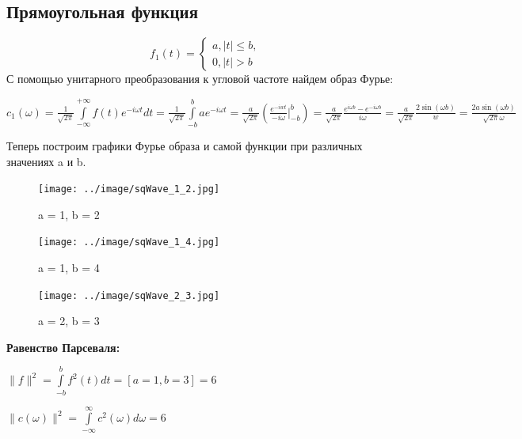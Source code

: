   \subsection{Прямоугольная функция}
  \[
  f_1(t) =  \begin{cases}
    a, |t| \leq b,\\
    0, |t| > b
  \end{cases}
  \]
  \noindent С помощью унитарного преобразования к угловой частоте найдем образ Фурье:
  \\
  \begin{center}
  $c_1(\omega) = \frac{1}{\sqrt{2\pi}} \int\limits_{-\infty}^{+\infty}f(t)e^{-i\omega t}dt = \frac{1}{\sqrt{2\pi}}\int\limits_{-b}^b a e^{-i\omega t} = 
  \frac{a}{\sqrt{2 \pi}} (\frac{e^{-iwt}}{-i\omega}|_{-b}^b) = \frac{a}{\sqrt{2 \pi}} \frac{e^{i\omega b} - e^{-i\omega b}}{i\omega} = \frac{a}{\sqrt{2 \pi}} \frac{2\sin(\omega b)}{w}  = \frac{2a \sin(\omega b)}{\sqrt{2 \pi} \omega}
  $ 
  \end{center}
\noindent Теперь построим графики Фурье образа и самой функции при различных значениях a и b.
\begin{figure}[!htb]
    \texttt{[image: ../image/sqWave\_1\_2.jpg]}
    \caption{a = 1, b = 2}
  \endminipage\hfill
    \texttt{[image: ../image/sqWave\_1\_4.jpg]}
    \caption{a = 1, b = 4}
  \endminipage\hfill
    \texttt{[image: ../image/sqWave\_2\_3.jpg]}
    \caption{a = 2, b = 3}
  \endminipage
  \end{figure}
  
  \noindent \textbf{Равенство Парсеваля:}\\
  
  \begin{center}
    $\parallel f \parallel^2 = \int\limits_{-b}^{b} f^2(t) dt= [a = 1, b = 3] = 6$
  \end{center}
  \begin{center}
    $\parallel c(\omega)\parallel^ 2 = \int\limits_{-\infty}^{\infty}c^2(\omega)d\omega = 6 $
  \end{center}
